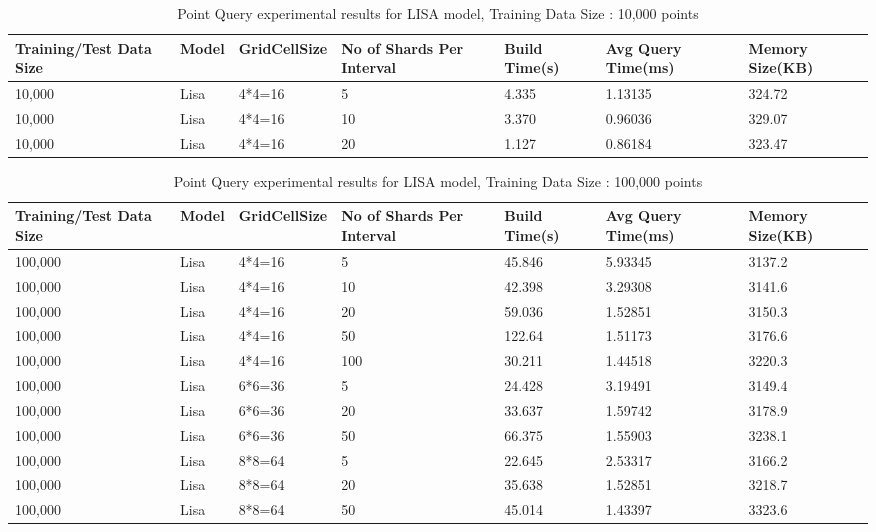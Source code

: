 \begin{table}
	\centering
	\begin{tabular}{||p{}<{\centering}|p{}<{\centering}|p{}<{\centering}| p{}<{\centering}|p{}<{\centering}|p{}<{\centering}|p{}<{\centering}||}
		\hline
		Training/Test Data Size& Model & GridCellSize & No of Shards Per Interval & Build Time(s) & Avg Query Time(ms) & Memory Size(KB)\\ [0.5ex] 
		\hline
		\hline
		10,000& Lisa& 4*4=16 & 5& 4.335& 1.13135 & 324.72\\
		\hline
		10,000& Lisa& 4*4=16 & 10& 3.370& 0.96036 & 329.07\\
		\hline
		10,000& Lisa& 4*4=16 & 20&1.127& 0.86184 & 323.47\\
		\hline
	    \hline
	\end{tabular}
	\label{baseline_search_optimization}
	\caption{Point Query experimental results for LISA model, Training Data Size : 10,000 points}
\end{table}

\begin{table}
	\centering
	\begin{tabular}{||p{}<{\centering}|p{}<{\centering}|p{}<{\centering}| p{}<{\centering}|p{}<{\centering}|p{}<{\centering}|p{}<{\centering}||}
		\hline
		Training/Test Data Size& Model & GridCellSize & No of Shards Per Interval & Build Time(s) & Avg Query Time(ms) & Memory Size(KB)\\ [0.5ex] 
		\hline
		\hline
	    100,000& Lisa& 4*4=16 & 5& 45.846& 5.93345 & 3137.2\\
		\hline
		100,000& Lisa& 4*4=16 & 10& 42.398& 3.29308 & 3141.6\\
		\hline
		100,000& Lisa& 4*4=16 & 20& 59.036&1.52851 & 3150.3\\
		\hline
		100,000& Lisa& 4*4=16 & 50& 122.64& 1.51173 & 3176.6\\
		\hline
		100,000& Lisa& 4*4=16 & 100& 30.211& 1.44518 & 3220.3\\
		\hline
		100,000& Lisa& 6*6=36 & 5& 24.428&3.19491 & 3149.4\\
		\hline
		100,000& Lisa& 6*6=36 & 20&33.637&1.59742 & 3178.9\\
		\hline
		100,000& Lisa& 6*6=36 & 50& 66.375& 1.55903 & 3238.1\\
		\hline
		100,000& Lisa& 8*8=64 & 5& 22.645& 2.53317 & 3166.2\\
		\hline
		100,000& Lisa& 8*8=64 & 20& 35.638& 1.52851 & 3218.7\\
		\hline
		100,000& Lisa& 8*8=64 & 50& 45.014& 1.43397 & 3323.6\\
		\hline
		\hline
	\end{tabular}
	\label{baseline_search_optimization}
	\caption{Point Query experimental results for LISA model, Training Data Size : 100,000 points}
\end{table}

